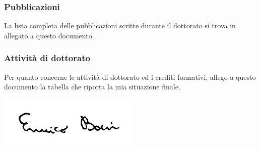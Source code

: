 \documentclass{article}
\begin{document}
\subsubsection*{Pubblicazioni}

La lista completa delle pubblicazioni scritte durante il dottorato si trova in allegato a questo documento.

\subsubsection*{Attività di dottorato}

Per quanto concerne le attività di dottorato ed i crediti formativi, allego a questo documento la tabella che riporta la mia situazione finale.

\vspace{20px}




\vspace{30pt}
\includegraphics[right]{signature}
\end{document}
